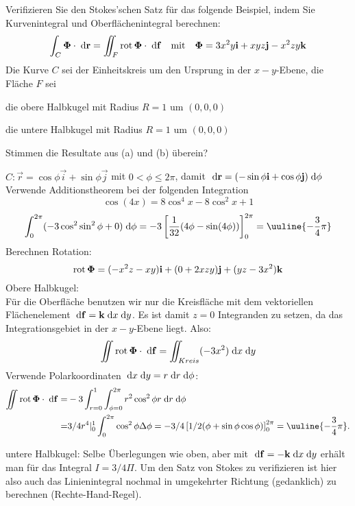 \begin{atiTask}[
  title = Verifikation Satz von Stokes II
]

Verifizieren Sie den Stokes'schen Satz für das folgende Beispiel, indem Sie  Kurvenintegral und Oberflächenintegral berechnen:
\[
\int_C\mathbf{\Phi}\cdot \;\mathrm{d}\mathbf{r}=\iint_F\operatorname{rot} \mathbf{\Phi} \cdot\;\mathrm{d}\mathbf{f}\quad\text{mit}\quad\mathbf{\Phi}=3x^2y\mathbf{i}+xyz\mathbf{j}-x^2zy\mathbf{k}
\]
Die Kurve $C$ sei der Einheitskreis um den Ursprung in der $x-y$-Ebene, die Fläche $F$ sei 
\begin{atiSubtasks}
\item die obere Halbkugel mit Radius $R=1$ um $(0,0,0)$
\item die untere Halbkugel mit Radius $R=1$ um $(0,0,0)$
\end{atiSubtasks}
Stimmen die Resultate aus (a) und (b) überein?

\end{atiTask}

\begin{atiSolution}
\begin{atiSubtasks}
\item $C:\vec{r}=\cos \phi \vec{i}+\sin\phi\vec{j}$ mit $0<\phi\leq 2\pi$, damit $\;\mathrm{d} \mathbf{r}=(-\sin\phi \mathbf{i}+\cos\phi \mathbf{j})\;\mathrm{d}\phi$
Verwende Additionstheorem bei der folgenden Integration
\[
\cos(4x)=8\cos^4x-8\cos^2x+1
\]
\[
\int_0^{2\pi}(-3\cos^2\sin^2\phi+0)\D \phi=-3\left[\frac{1}{32}(4\phi-\sin (4\phi))\right]_0^{2\pi}=\uuline{-\frac{3}{4}\pi}
\]
Berechnen Rotation:
\[
\operatorname{rot} \mathbf{\Phi}=(-x^2z-xy)\mathbf{i}+(0+2xzy)\mathbf{j}+(yz-3x^2)\mathbf{k}
\]
Obere Halbkugel:\\
Für die Oberfläche benutzen wir nur die Kreisfläche mit dem vektoriellen Flächenelement
$\;\mathrm{d} \mathbf{f}=\mathbf{k} \;\mathrm{d} x\;\mathrm{d} y$. Es ist damit $z=0$ Integranden zu setzen, da das Integrationsgebiet in der $x-y$-Ebene liegt. Also:
\[
\iint \operatorname{rot} \mathbf{\Phi}\cdot \;\mathrm{d} \mathbf{f}= \iint_{Kreis}(-3x^2)\;\mathrm{d} x\;\mathrm{d} y
\]
Verwende Polarkoordinaten $\;\mathrm{d} x\;\mathrm{d} y=r\;\mathrm{d} r \;\mathrm{d} \phi$:
\begin{align*}
\iint \curl \vec{\Phi}\cdot \D \vec{f}=& -3 \int_{r=0}^1\int_{\phi=0}^{2\pi}r^2\cos^2\phi r\D r\D \phi\\
=& 3/4r^4|_0^1\int_0^{2\pi}\cos^2\phi\Delta\phi =-3/4\left[1/2(\phi+\sin\phi\cos\phi)\right]_0^{2\pi}=\uuline{-\frac{3}{4}\pi}.
\end{align*}
\item untere Halbkugel: Selbe Überlegungen wie oben, aber mit $\;\mathrm{d} \mathbf{f}=-\mathbf{k} \;\mathrm{d} x\;\mathrm{d} y$ erhält man für das Integral $I=3/4\Pi$. Um den Satz von Stokes zu verifizieren ist hier also auch das Linienintegral nochmal in umgekehrter Richtung (gedanklich) zu berechnen (Rechte-Hand-Regel).
\end{atiSubtasks}
\end{atiSolution}